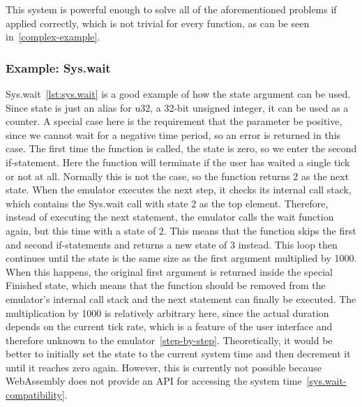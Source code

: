 This system is powerful enough to solve all of the aforementioned problems if applied correctly, which is not trivial for every function, as can be seen in~\cref{complex-example}.
\subsubsection{Example: Sys.wait}
Sys.wait~\ref{lst:sys.wait} is a good example of how the state argument can be used.
Since state is just an alias for u32, a 32-bit unsigned integer, it can be used as a counter.
A special case here is the requirement that the parameter be positive, since we cannot wait for a negative time period, so an error is returned in this case.
The first time the function is called, the state is zero, so we enter the second if-statement. Here the function will terminate if the user has waited a single tick or not at all.
Normally this is not the case, so the function returns 2 as the next state.
When the emulator executes the next step, it checks its internal call stack, which contains the Sys.wait call with state 2 as the top element.
Therefore, instead of executing the next statement, the emulator calls the wait function again, but this time with a state of 2. This means that the function skips the first and second if-statements and returns a new state of 3 instead.
This loop then continues until the state is the same size as the first argument multiplied by 1000. When this happens, the original first argument is returned inside the special Finished state, which means that the function should be removed from the emulator's internal call stack and the next statement can finally be executed.
The multiplication by 1000 is relatively arbitrary here, since the actual duration depends on the current tick rate, which is a feature of the user interface and therefore unknown to the emulator~\ref{step-by-step}.
Theoretically, it would be better to initially set the state to the current system time and then decrement it until it reaches zero again. However, this is currently not possible because WebAssembly does not provide an API for accessing the system time~\ref{sys.wait-compatibility}.

